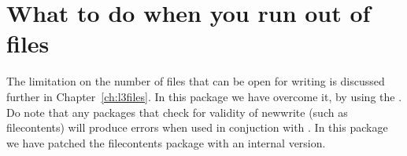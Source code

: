 \section{What to do when you run out of files}

The limitation on the number of files that can be open for writing is discussed further in Chapter~\ref{ch:l3files}.  In this package we have overcome it, by using the . Do note that any packages that check for validity of newwrite (such as filecontents) will produce errors when used in conjuction with . In this package we have patched the filecontents  package with an internal version.


































